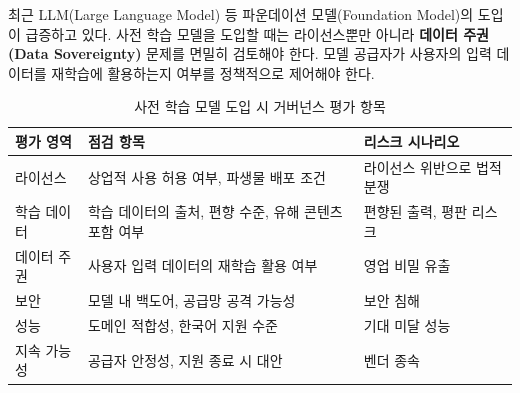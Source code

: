 최근 LLM(Large Language Model) 등 파운데이션 모델(Foundation Model)의 도입이 급증하고 있다. 사전 학습 모델을 도입할 때는 라이선스뿐만 아니라 \textbf{데이터 주권(Data Sovereignty)} 문제를 면밀히 검토해야 한다. 모델 공급자가 사용자의 입력 데이터를 재학습에 활용하는지 여부를 정책적으로 제어해야 한다.

\begin{table}[htbp]
\centering
\caption{사전 학습 모델 도입 시 거버넌스 평가 항목}
\label{tab:pretrained_model_governance}
\begin{tabularx}{\textwidth}{p{3cm}XX}
\toprule
\textbf{평가 영역} & \textbf{점검 항목} & \textbf{리스크 시나리오} \\
\midrule
라이선스 & 상업적 사용 허용 여부, 파생물 배포 조건 & 라이선스 위반으로 법적 분쟁 \\
\midrule
학습 데이터 & 학습 데이터의 출처, 편향 수준, 유해 콘텐츠 포함 여부 & 편향된 출력, 평판 리스크 \\
\midrule
데이터 주권 & 사용자 입력 데이터의 재학습 활용 여부 & 영업 비밀 유출 \\
\midrule
보안 & 모델 내 백도어, 공급망 공격 가능성 & 보안 침해 \\
\midrule
성능 & 도메인 적합성, 한국어 지원 수준 & 기대 미달 성능 \\
\midrule
지속 가능성 & 공급자 안정성, 지원 종료 시 대안 & 벤더 종속 \\
\bottomrule
\end{tabularx}
\end{table}

